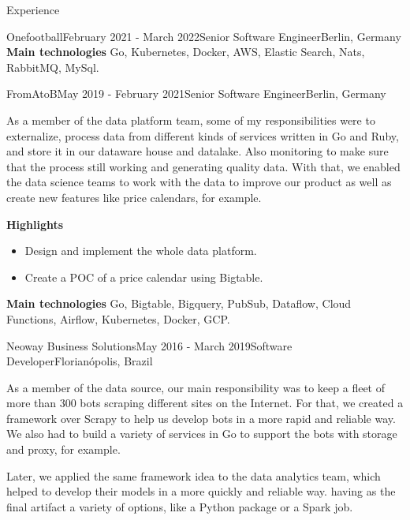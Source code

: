 \documentclass[
	a4paper, %
	10pt, %
]{resume} %
\begin{document}
\begin{rSection}{Experience}
\begin{rSubsection}{Onefootball}{February 2021 - March 2022}{Senior Software Engineer}{Berlin, Germany}
		\textbf{Main technologies}
			Go, Kubernetes, Docker, AWS, Elastic Search, Nats, RabbitMQ, MySql.

	\end{rSubsection}

	\vspace{1mm}

	\begin{rSubsection}{FromAtoB}{May 2019 - February 2021}{Senior Software Engineer}{Berlin, Germany}
		\item[]
		As a member of the data platform team, some of my responsibilities were to externalize, process data from different kinds of services written in Go and Ruby,
		and store it in our dataware house and datalake.
		Also monitoring to make sure that the process still working and generating quality data.
		With that, we enabled the data science teams to work with the data to improve our product as well as create new features like price calendars, for example.

		\textbf{Highlights}
		\begin{itemize}
			\item Design and implement the whole data platform.
			\item Create a POC of a price calendar using Bigtable.
		\end{itemize}

		\textbf{Main technologies}
			Go, Bigtable, Bigquery, PubSub, Dataflow, Cloud Functions, Airflow, Kubernetes, Docker, GCP.


	\end{rSubsection}

	\vspace{1mm}

	\begin{rSubsection}{Neoway Business Solutions}{May 2016 - March 2019}{Software Developer}{Florianópolis, Brazil}
		\item[]
		As a member of the data source, our main responsibility was to keep a fleet of more than 300 bots scraping different sites on the Internet.
		For that, we created a framework over Scrapy to help us develop bots in a more rapid and reliable way.
		We also had to build a variety of services in Go to support the bots with storage and proxy, for example.

		Later, we applied the same framework idea to the data analytics team, which helped to develop their models in a more quickly and reliable way.
		having as the final artifact a variety of options, like a Python package or a Spark job.


\end{rSubsection}
\end{rSection}
\end{document}
